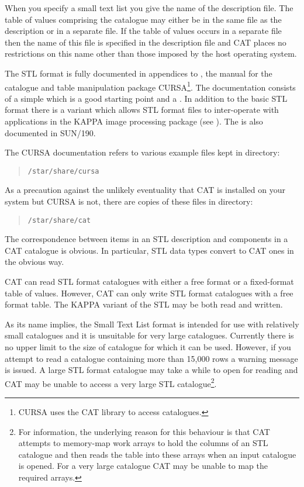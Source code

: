 \documentclass[11pt,twoside]{starlink}
\begin{document}
When you specify a small text list you give the name of the description
file.  The table of values comprising the catalogue may either be in the
same file as the description or in a separate file.  If the table of values
occurs in a separate file then the name of this file is specified in the
description file and CAT places no restrictions on this name other than
those imposed by the host operating system.

The STL format is fully documented in appendices to
\cite{SUN190}, the manual for the catalogue and
table manipulation package CURSA\footnote{CURSA uses the CAT library to
access catalogues.}.  The documentation consists of a simple
 which is a good starting point and a
.  In addition to the basic STL
format there is a variant which allows STL format files to inter-operate
with applications in the KAPPA image processing package (see
\cite{SUN190}).  The
 is also documented in SUN/190.

The CURSA documentation refers to various example files kept in
directory:

\begin{verse}
\texttt{/star/share/cursa}
\end{verse}

As a precaution against the unlikely eventuality that CAT is installed
on your system but CURSA is not, there are copies of these files in
directory:

\begin{verse}
\texttt{/star/share/cat}
\end{verse}

The correspondence between items in an STL description and components
in a CAT catalogue is obvious.  In particular, STL data types convert
to CAT ones in the obvious way.

CAT can read STL format catalogues with either a free format or a
fixed-format table of values.  However, CAT can only write STL format
catalogues with a free format table.  The KAPPA variant of the STL may be
both read and written.

As its name implies, the Small Text List format is intended for use
with relatively small catalogues and it is unsuitable for very large
catalogues.  Currently there is no upper limit to the size of catalogue
for which it can be used.  However, if you attempt to read a catalogue
containing more than 15,000 rows a warning message is issued.  A large STL
format catalogue may take a while to open for reading and CAT may be
unable to access a very large STL catalogue\footnote{For
information, the underlying reason for this behaviour is that CAT
attempts to memory-map work arrays to hold the columns of an STL
catalogue and then reads the table into these arrays when an input
catalogue is opened.  For a very large catalogue CAT may be unable to
map the required arrays.}.
\end{document}
